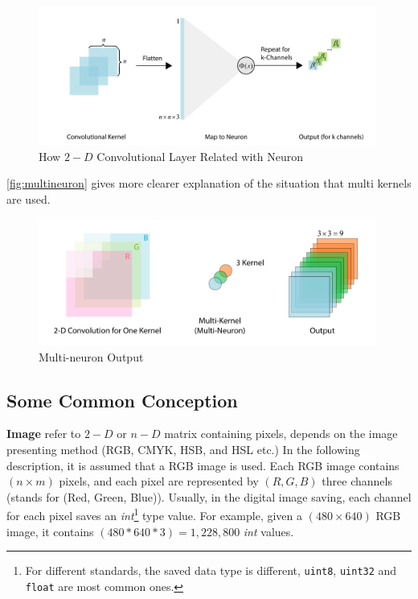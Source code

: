 \begin{spacing}{1.5}
\begin{figure}[ht]
\centering
\includegraphics[width=0.99\textwidth, fbox]{Chapter2/convtoneuron.pdf}
\caption{How $2-D$ Convolutional Layer Related with Neuron}
\label{fig:convtoneuron} 
\end{figure}

\autoref{fig:multineuron} gives more clearer explanation of the situation that multi kernels are used.

\begin{figure}[ht]
\centering
\includegraphics[width=0.99\textwidth, fbox]{Chapter2/multineuron.pdf}
\caption{Multi-neuron Output}
\label{fig:multineuron} 
\end{figure}

\subsection{Some Common Conception}

\textbf{Image} refer to $2-D$ or $n-D$ matrix containing pixels, depends on the image presenting method (RGB, CMYK, HSB, and HSL etc.) In the following description, it is assumed that a RGB image is used. Each RGB image contains $(n \times m)$ pixels, and each pixel are represented by $(R,G,B)$ three channels (stands for (Red, Green, Blue)). Usually, in the digital image saving, each channel for each pixel saves an \textit{int}\footnote{For different standards, the saved data type is different, \texttt{uint8}, \texttt{uint32} and \texttt{float} are most common ones.} type value. For example, given a $(480 \times 640)$ RGB image, it contains $(480 * 640 * 3)=1,228,800$ \textit{int} values.


\end{spacing}

